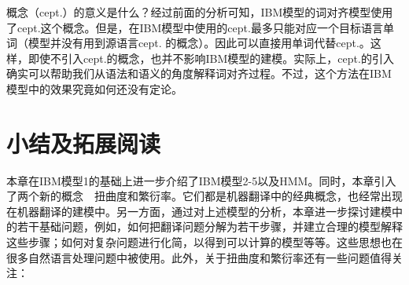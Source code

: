 \parinterval 概念（cept.）的意义是什么？经过前面的分析可知，IBM模型的词对齐模型使用了cept.这个概念。但是，在IBM模型中使用的cept.最多只能对应一个目标语言单词（模型并没有用到源语言cept. 的概念）。因此可以直接用单词代替cept.。这样，即使不引入cept.的概念，也并不影响IBM模型的建模。实际上，cept.的引入确实可以帮助我们从语法和语义的角度解释词对齐过程。不过，这个方法在IBM 模型中的效果究竟如何还没有定论。


\sectionnewpage
\section{小结及拓展阅读}

本章在IBM模型1的基础上进一步介绍了IBM模型2-5以及HMM。同时，本章引入了两个新的概念\ \dash\ 扭曲度和繁衍率。它们都是机器翻译中的经典概念，也经常出现在机器翻译的建模中。另一方面，通过对上述模型的分析，本章进一步探讨建模中的若干基础问题，例如，如何把翻译问题分解为若干步骤，并建立合理的模型解释这些步骤；如何对复杂问题进行化简，以得到可以计算的模型等等。这些思想也在很多自然语言处理问题中被使用。此外，关于扭曲度和繁衍率还有一些问题值得关注：


